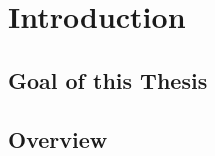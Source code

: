 \section*{Introduction}\label{ch:introduction}

\subsection*{Goal of this Thesis}

\subsection*{Overview}
